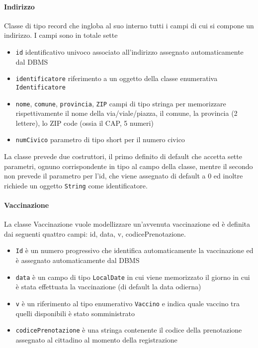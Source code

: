 	\paragraph{Indirizzo}
	Classe di tipo record che ingloba al suo interno tutti i campi di cui si compone un indirizzo.
	I campi sono in totale sette
	\begin{itemize}
		\item \verb|id| identificativo univoco associato all'indirizzo assegnato automaticamente dal DBMS
		\item \verb|identificatore| riferimento a un oggetto della classe enumerativa \verb|Identificatore|
		\item  \verb|nome|, \verb|comune|, \verb|provincia|, \verb|ZIP| campi di tipo stringa per memorizzare rispettivamente il nome della via/viale/piazza, il comune, la provincia (2 lettere), lo ZIP code (ossia il CAP, 5 numeri)
		\item \verb|numCivico| parametro di tipo short per il numero civico
	\end{itemize}
	La classe prevede due costruttori, il primo definito di default che accetta sette parametri, ognuno corrispondente in tipo al campo della classe, mentre il secondo non prevede il parametro per l'id, che viene assegnato di default a 0 ed inoltre richiede un oggetto \verb|String| come identificatore.
	
	
	\paragraph{Vaccinazione}
	La classe Vaccinazione vuole modellizzare un’avvenuta vaccinazione ed è definita dai seguenti quattro campi: id, data, v, codicePrenotazione.
	\begin{itemize}
		\item \verb|Id| è un numero progressivo che identifica automaticamente la vaccinazione ed è assegnato automaticamente dal DBMS
		\item \verb|data| è un campo di tipo \verb|LocalDate| in cui viene memorizzato il giorno in cui è stata effettuata la vaccinazione (di default la data odierna)
		\item \verb|v| è un riferimento al tipo enumerativo \verb|Vaccino| e indica quale vaccino tra quelli disponibili è stato somministrato
		\item \verb|codicePrenotazione| è una stringa contenente il codice della prenotazione assegnato al cittadino al momento della registrazione
	\end{itemize}
	
